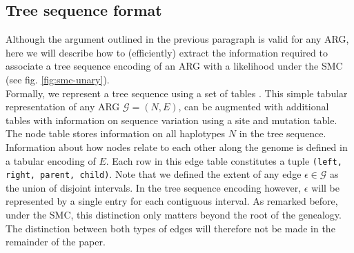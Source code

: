 \documentclass{article}
\begin{document}
\subsection{Tree sequence format} \label{par:algo}

Although the argument outlined in the previous paragraph is valid for any ARG, here we 
will describe how to (efficiently) extract the information required to associate a
tree sequence encoding of an ARG with a likelihood under the SMC (see fig. \ref{fig:smc-unary}).\\

Formally, we represent a tree sequence using a set of tables \citep{kelleher_efficient_2018}. 
This simple tabular representation of any ARG $\mathcal{G} = (N, E)$, can be 
augmented with additional tables with information on sequence variation
using a site and mutation table. The node table stores information on all 
haplotypes $N$ in the tree sequence. Information about how nodes relate to 
each other along the genome is defined in a tabular encoding of $E$.
Each row in this edge table constitutes a tuple \texttt{(left, right, parent, child)}.
Note that we defined the extent of any edge $\epsilon \in \mathcal{G}$ as the union of 
disjoint intervals. In the tree sequence encoding however, $\epsilon$ will be represented 
by a single entry for each contiguous interval. As remarked before, under the SMC, this 
distinction only matters beyond the root of the genealogy. The distinction between both 
types of edges will therefore not be made in the remainder of the paper.
\\
\end{document}
